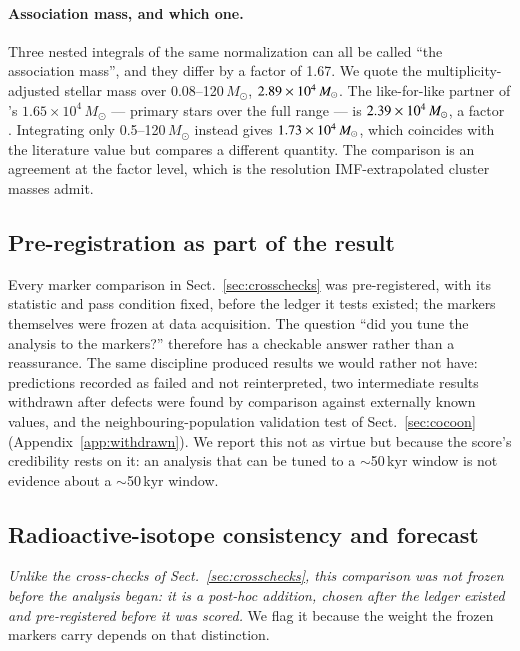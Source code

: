 \documentclass{aa}
\begin{document}
\paragraph{Association mass, and which one.}
Three nested integrals of the same normalization can all be called ``the
association mass'', and they differ by a factor of 1.67. We quote the
multiplicity-adjusted stellar mass over 0.08--120\,$M_\odot$,
$2.89\times10^{4}\,M_\odot$. The like-for-like partner of
\citeauthor{wright2015}'s \citeyear{wright2015} $1.65\times10^{4}\,M_\odot$ ---
primary stars over the full range --- is $2.39\times10^{4}\,M_\odot$,
a factor \massVsWright. Integrating only 0.5--120\,$M_\odot$ instead gives
$1.73\times10^{4}\,M_\odot$, which coincides with the literature
value but compares a different quantity. The comparison is an agreement at the
factor level, which is the resolution IMF-extrapolated cluster masses admit.

\subsection{Pre-registration as part of the result}

Every marker comparison in Sect.~\ref{sec:crosschecks} was pre-registered, with
its statistic and pass condition fixed, before the ledger it tests existed; the
markers themselves were frozen at data acquisition. The question ``did you tune
the analysis to the markers?'' therefore has a checkable answer rather than a
reassurance. The same discipline produced results we would rather not have:
predictions recorded as failed and not reinterpreted, two intermediate results
withdrawn after defects were found by comparison against externally known
values, and the neighbouring-population validation test of Sect.~\ref{sec:cocoon}
(Appendix~\ref{app:withdrawn}). We report this not as virtue but because the
score's credibility rests on it: an analysis that can be tuned to a
$\sim$50\,kyr window is not evidence about a $\sim$50\,kyr window.

\subsection{Radioactive-isotope consistency and forecast}\label{sec:cosi}

\emph{Unlike the cross-checks of Sect.~\ref{sec:crosschecks}, this comparison
was not frozen before the analysis began: it is a post-hoc addition, chosen
after the ledger existed and pre-registered before it was scored.} We flag it
because the weight the frozen markers carry depends on that distinction.
\end{document}
